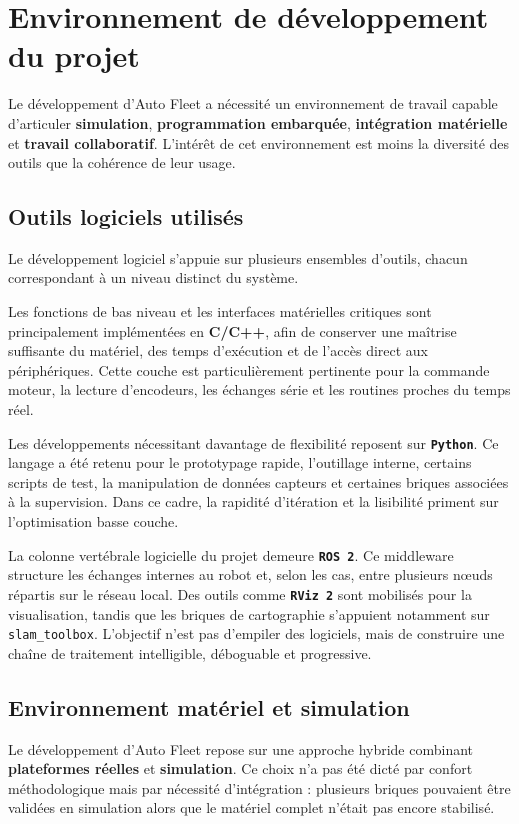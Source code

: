 \documentclass[11pt,a4paper]{report}
\newcommand{\kw}[1]{\textbf{#1}}
\newcommand{\outil}[1]{\textbf{\texttt{#1}}}
\begin{document}
\section{Environnement de développement du projet}

Le développement d’Auto Fleet a nécessité un environnement de travail capable d’articuler \kw{simulation}, \kw{programmation embarquée}, \kw{intégration matérielle} et \kw{travail collaboratif}. L’intérêt de cet environnement est moins la diversité des outils que la cohérence de leur usage.

\subsection{Outils logiciels utilisés}

Le développement logiciel s’appuie sur plusieurs ensembles d’outils, chacun correspondant à un niveau distinct du système.

Les fonctions de bas niveau et les interfaces matérielles critiques sont principalement implémentées en \kw{C/C++}, afin de conserver une maîtrise suffisante du matériel, des temps d’exécution et de l’accès direct aux périphériques. Cette couche est particulièrement pertinente pour la commande moteur, la lecture d’encodeurs, les échanges série et les routines proches du temps réel.

Les développements nécessitant davantage de flexibilité reposent sur \outil{Python}. Ce langage a été retenu pour le prototypage rapide, l’outillage interne, certains scripts de test, la manipulation de données capteurs et certaines briques associées à la supervision. Dans ce cadre, la rapidité d’itération et la lisibilité priment sur l’optimisation basse couche.

La colonne vertébrale logicielle du projet demeure \outil{ROS 2}. Ce middleware structure les échanges internes au robot et, selon les cas, entre plusieurs nœuds répartis sur le réseau local. Des outils comme \outil{RViz 2} sont mobilisés pour la visualisation, tandis que les briques de cartographie s’appuient notamment sur \texttt{slam\_toolbox}. L’objectif n’est pas d’empiler des logiciels, mais de construire une chaîne de traitement intelligible, déboguable et progressive.

\subsection{Environnement matériel et simulation}

Le développement d’Auto Fleet repose sur une approche hybride combinant \kw{plateformes réelles} et \kw{simulation}. Ce choix n’a pas été dicté par confort méthodologique mais par nécessité d’intégration : plusieurs briques pouvaient être validées en simulation alors que le matériel complet n’était pas encore stabilisé.
\end{document}

